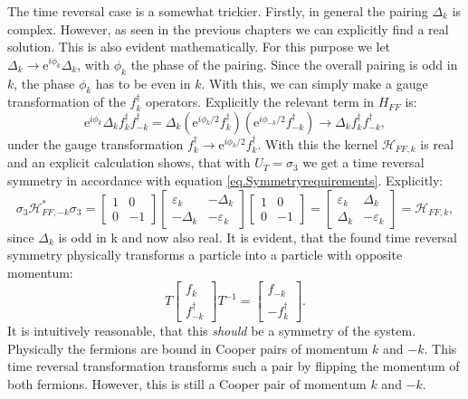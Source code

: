 The time reversal case is a somewhat trickier. Firstly, in general the pairing $\Delta_k$ is complex. However, as seen in the previous chapters we can explicitly find a real solution. This is also evident mathematically. For this purpose we let $\Delta_k \to \text{e}^{i\phi_k}\Delta_k$, with $\phi_k$ the phase of the pairing. Since the overall pairing is odd in $k$, the phase $\phi_k$ has to be even in $k$. With this, we can simply make a gauge transformation of the $f_k^\dagger$ operators. Explicitly the relevant term in $H_{FF}$ is:
\begin{equation}
\text{e}^{i\phi_k}\Delta_k f^\dagger_k f^\dagger_{-k} = \Delta_k (\text{e}^{i\phi_k/2}f^\dagger_k )(\text{e}^{i\phi_{-k}/2}f^\dagger_{-k} ) \to \Delta_k f^\dagger_k f^\dagger_{-k}, \nonumber
\end{equation}
under the gauge transformation $f^\dagger_k \to \text{e}^{i\phi_k/2} f^\dagger_k$. With this the kernel $\mathcal{H}_{FF,k}$ is real and an explicit calculation shows, that with $U_T = \sigma_3$ we get a time reversal symmetry in accordance with equation \ref{eq.Symmetryrequirements}. Explicitly:
\begin{equation}
\sigma_3\mathcal{H}^*_{FF,-k}\sigma_3 = \begin{bmatrix} 1 & 0 \\ 0 & -1 \end{bmatrix}\begin{bmatrix} \varepsilon_k & -\Delta_k \\ -\Delta_k & -\varepsilon_k \end{bmatrix} \begin{bmatrix} 1 & 0 \\ 0 & -1 \end{bmatrix} = \begin{bmatrix} \varepsilon_k & \Delta_k \\ \Delta_k & -\varepsilon_k \end{bmatrix} = \mathcal{H}_{FF,k}, \nonumber
\end{equation}
since $\Delta_k$ is odd in k and now also real. It is evident, that the found time reversal symmetry physically transforms a particle into a particle with opposite momentum:
\begin{equation}
T \begin{bmatrix} f_k \\ f^\dagger_{-k} \end{bmatrix} T^{-1} = \begin{bmatrix} f_{-k} \\ -f^\dagger_{k} \end{bmatrix}. \nonumber
\end{equation}
It is intuitively reasonable, that this \textit{should} be a symmetry of the system. Physically the fermions are bound in Cooper pairs of momentum $k$ and $-k$. This time reversal transformation transforms such a pair by flipping the momentum of both fermions. However, this is still a Cooper pair of momentum $k$ and $-k$.  

